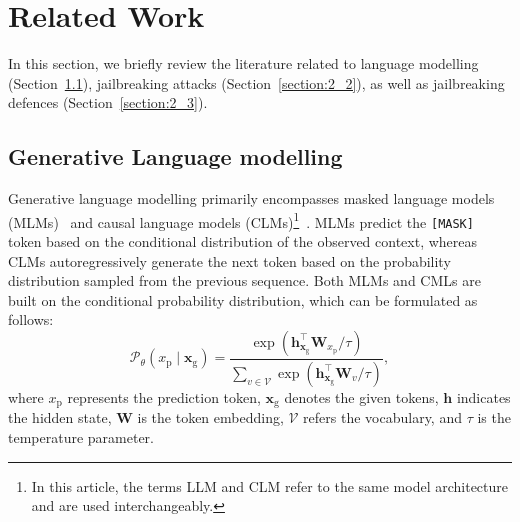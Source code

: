 \section{Related Work}
In this section, we briefly review the literature related to language modelling (Section~\ref{section:2_1}), jailbreaking attacks (Section~\ref{section:2_2}), as well as jailbreaking defences (Section~\ref{section:2_3}).

\subsection{Generative Language modelling}
\label{section:2_1}

Generative language modelling primarily encompasses masked language models (MLMs)~\citep{devlin2019bert} and causal language models (CLMs)\footnote{In this article, the terms LLM and CLM refer to the same model architecture and are used interchangeably.}~\citep{openAI2023gpt, llama3modelcard}.
MLMs predict the \texttt{[MASK]} token based on the conditional distribution of the observed context, whereas CLMs autoregressively generate the next token based on the probability distribution sampled from the previous sequence.
Both MLMs and CMLs are built on the conditional probability distribution, which can be formulated as follows:
\vspace{-0.5em}
\begin{equation}
\label{equation:1}
\mathcal{P}_\theta\left(x_{\text{p}} \mid \mathbf{x}_{\text{g}}\right)=\frac{\exp \left(\mathbf{h}_{\mathbf{x}_{\text{g}}}^{\top} \mathbf{W}_{x_{\text{p}}} / \tau\right)}{\sum_{v \in \mathcal{V}} \exp \left(\mathbf{h}_{\mathbf{x}_{\text{g}}}^{\top} \mathbf{W}_v / \tau\right)},
\end{equation} 
where $x_{\text{p}}$ represents the prediction token, $\mathbf{x}_{\text{g}}$ denotes the given tokens, $\mathbf{h}$ indicates the hidden state, $\mathbf{W}$ is the token embedding, $\mathcal{V}$ refers the vocabulary, and $\tau$ is the temperature parameter.

